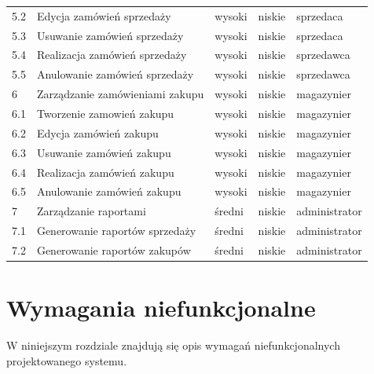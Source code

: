 \begin{table}[ht]
\begin{center}
\begin{tabular}{| l | l | l | l | l |}
		   	5.2 & Edycja zamówień sprzedaży & wysoki & niskie & sprzedaca \\
		   	5.3 & Usuwanie zamówień sprzedaży & wysoki & niskie & sprzedaca \\
		   	5.4 & Realizacja zamówień sprzedaży & wysoki & niskie & sprzedawca \\
		   	5.5 & Anulowanie zamówień sprzedaży & wysoki & niskie & sprzedawca \\
		   	\hline
		   	6 & Zarządzanie zamówieniami zakupu & wysoki & niskie & magazynier \\
		   	6.1 & Tworzenie zamowień zakupu & wysoki & niskie & magazynier \\
		   	6.2 & Edycja zamówień zakupu & wysoki & niskie & magazynier \\
		   	6.3 & Usuwanie zamówień zakupu & wysoki & niskie & magazynier \\
		   	6.4 & Realizacja zamówień zakupu & wysoki & niskie & magazynier \\
		   	6.5 & Anulowanie zamówień zakupu & wysoki & niskie & magazynier \\
		   	\hline
		   	7 & Zarządzanie raportami & średni & niskie & administrator \\
		   	7.1 & Generowanie raportów sprzedaży & średni & niskie & administrator \\
		   	7.2 & Generowanie raportów zakupów & średni & niskie & administrator \\
		   	\hline
		   	\hline
	    \end{tabular}
	\end{center}
\end{table}
\FloatBarrier

\section{Wymagania niefunkcjonalne}

W niniejszym rozdziale znajdują się opis wymagań niefunkcjonalnych
projektowanego systemu.

